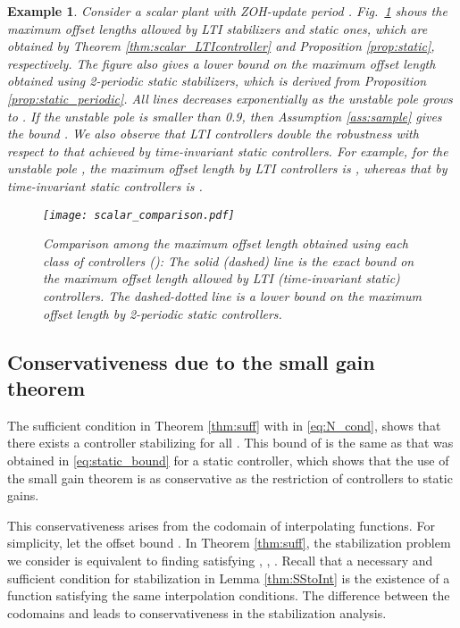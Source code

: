 \documentclass[letterpaper, 12pt, draftcls, onecolumn]{ieeeconf}
\newtheorem{example}[theorem]{Example}
\begin{document}
\begin{example}
		Consider a scalar plant with ZOH-update period . 
		Fig.~\ref{fig:comparison} shows the maximum offset lengths 
		 allowed by
		LTI stabilizers and static ones, which are
		obtained by 
		Theorem \ref{thm:scalar_LTIcontroller}
		and
		Proposition \ref{prop:static}, respectively. 
		The figure also 
		gives a lower bound on the maximum offset length obtained
		using 2-periodic static stabilizers,
		which is derived from Proposition \ref{prop:static_periodic}.
		All lines decreases exponentially as the unstable pole 
		 grows to .
		If the unstable pole  is smaller than 0.9, then
		Assumption \ref{ass:sample} gives the bound 
		.
		We also observe that LTI controllers double the robustness 
		with respect to that
		achieved by time-invariant static controllers.
		For example, for the unstable pole ,
		the maximum offset length by LTI controllers
		is ,
		whereas that by time-invariant static controllers is 
		. 
		
		\begin{figure}[bt]
			\centering
			\texttt{[image: scalar\_comparison.pdf]}
			\caption{Comparison among the maximum offset length 
				 obtained using 
				each class of controllers (): 
				The solid (dashed) line is the exact
				bound on the maximum offset length allowed by LTI 
				(time-invariant static) controllers.
				The dashed-dotted line is a lower bound on the maximum offset length
				by 2-periodic static controllers.}
			\label{fig:comparison}
		\end{figure}
\end{example}



\subsection{Conservativeness due to the small gain theorem}
The sufficient condition in Theorem \ref{thm:suff} with
 in
\eqref{eq:N_cond}, shows that 
there exists a controller stabilizing 
for all .
This bound of  
is the same as that was obtained in
\eqref{eq:static_bound} for a static controller,
which shows that 
the use of the small gain theorem is as conservative as
the restriction of controllers to static gains.

This conservativeness arises from the codomain of
interpolating functions.
For simplicity, let the offset bound 
.
In Theorem \ref{thm:suff},
the stabilization problem we consider is equivalent to
finding  satisfying ,
, .
Recall that a necessary and sufficient condition for stabilization in 
Lemma \ref{thm:SStoInt}
is the existence of a function 
 satisfying the same interpolation
conditions.
The difference between the codomains  and
 leads to
conservativeness in the stabilization analysis.
\end{document}
